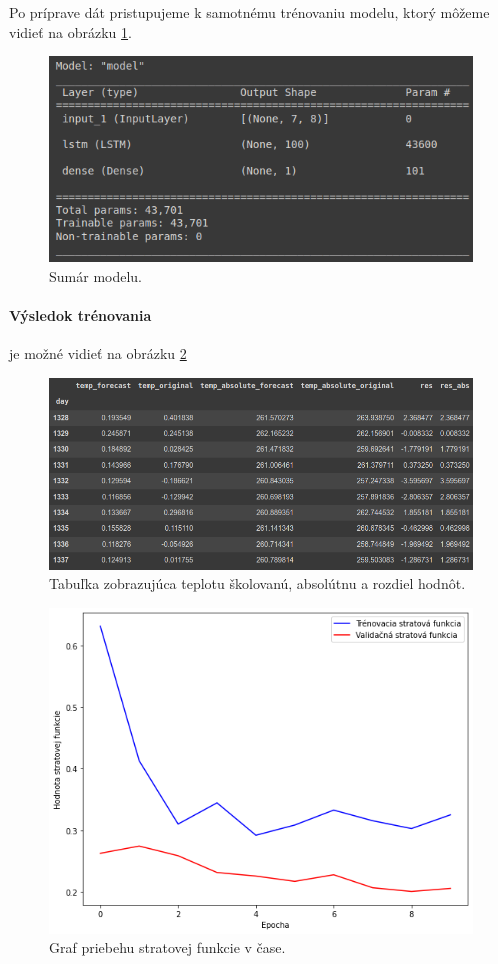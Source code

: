 Po príprave dát pristupujeme k samotnému trénovaniu modelu, ktorý môžeme vidieť na obrázku \ref{model}. 

\begin{figure}[!htbp]
  \centering
  \includegraphics[width=12cm]{img/model.png}
  \caption{Sumár modelu.}
  \label{model}
\end{figure}


\newpage
\paragraph{Výsledok trénovania} je možné vidieť na obrázku \ref{tabhondot}
\begin{figure}[!htbp]
  \centering
  \includegraphics[width=13cm]{img/tabulka_hodnot.png}
  \caption{Tabuľka zobrazujúca teplotu školovanú, absolútnu a rozdiel hodnôt.}
  \label{tabhondot}
\end{figure}


\begin{figure}[!htbp]
  \centering
  \includegraphics[width=14cm]{img/loss.png}
  \caption{Graf priebehu stratovej funkcie v čase.}
  \label{lossfunction}
\end{figure}

